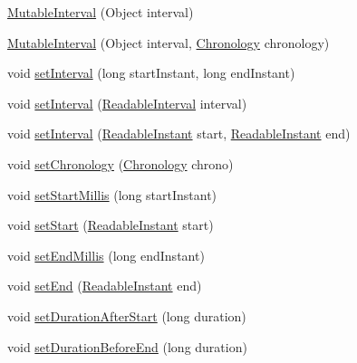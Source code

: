 \begin{DoxyCompactItemize}
\hyperlink{classorg_1_1joda_1_1time_1_1_mutable_interval_ac8cb8a4430825b65e71c19c6beae5971}{Mutable\-Interval} (Object interval)
\item 
\hyperlink{classorg_1_1joda_1_1time_1_1_mutable_interval_a18cc42eb496fd1fa07704e55e4e96dec}{Mutable\-Interval} (Object interval, \hyperlink{classorg_1_1joda_1_1time_1_1_chronology}{Chronology} chronology)
\item 
void \hyperlink{classorg_1_1joda_1_1time_1_1_mutable_interval_a8620bfaa7ce66c53b1eafb75cd78d1d4}{set\-Interval} (long start\-Instant, long end\-Instant)
\item 
void \hyperlink{classorg_1_1joda_1_1time_1_1_mutable_interval_ac5f906649161e21e9e468a9465c458bd}{set\-Interval} (\hyperlink{interfaceorg_1_1joda_1_1time_1_1_readable_interval}{Readable\-Interval} interval)
\item 
void \hyperlink{classorg_1_1joda_1_1time_1_1_mutable_interval_a227dc4d75c94ac1a014852345902f387}{set\-Interval} (\hyperlink{interfaceorg_1_1joda_1_1time_1_1_readable_instant}{Readable\-Instant} start, \hyperlink{interfaceorg_1_1joda_1_1time_1_1_readable_instant}{Readable\-Instant} end)
\item 
void \hyperlink{classorg_1_1joda_1_1time_1_1_mutable_interval_a90f2908e8325eb6216f94d6dafe2aec1}{set\-Chronology} (\hyperlink{classorg_1_1joda_1_1time_1_1_chronology}{Chronology} chrono)
\item 
void \hyperlink{classorg_1_1joda_1_1time_1_1_mutable_interval_ace3c6d867af59d9d2698d63a2c0712c7}{set\-Start\-Millis} (long start\-Instant)
\item 
void \hyperlink{classorg_1_1joda_1_1time_1_1_mutable_interval_a5e658df3f5e7a5d3072f60f406506aad}{set\-Start} (\hyperlink{interfaceorg_1_1joda_1_1time_1_1_readable_instant}{Readable\-Instant} start)
\item 
void \hyperlink{classorg_1_1joda_1_1time_1_1_mutable_interval_add83ca272cb02d18497cb9073f684cf5}{set\-End\-Millis} (long end\-Instant)
\item 
void \hyperlink{classorg_1_1joda_1_1time_1_1_mutable_interval_afbd4bc7906f497664b3ac5df7c255518}{set\-End} (\hyperlink{interfaceorg_1_1joda_1_1time_1_1_readable_instant}{Readable\-Instant} end)
\item 
void \hyperlink{classorg_1_1joda_1_1time_1_1_mutable_interval_ab90c02a5c9d45703b3b8583b74ec0777}{set\-Duration\-After\-Start} (long duration)
\item 
void \hyperlink{classorg_1_1joda_1_1time_1_1_mutable_interval_af672716d30e577046825efaa252e6436}{set\-Duration\-Before\-End} (long duration)

\end{DoxyCompactItemize}
